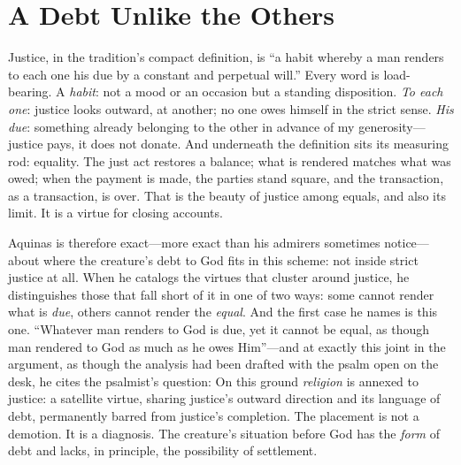 \section{A Debt Unlike the Others}

Justice, in the tradition's compact definition, is ``a habit whereby a man renders to each one his due by a constant and perpetual will.'' Every word is load-bearing. A \emph{habit}: not a mood or an occasion but a standing disposition. \emph{To each one}: justice looks outward, at another; no one owes himself in the strict sense. \emph{His due}: something already belonging to the other in advance of my generosity---justice pays, it does not donate. And underneath the definition sits its measuring rod: equality. The just act restores a balance; what is rendered matches what was owed; when the payment is made, the parties stand square, and the transaction, as a transaction, is over. That is the beauty of justice among equals, and also its limit. It is a virtue for closing accounts.

Aquinas is therefore exact---more exact than his admirers sometimes notice---about where the creature's debt to God fits in this scheme: not inside strict justice at all. When he catalogs the virtues that cluster around justice, he distinguishes those that fall short of it in one of two ways: some cannot render what is \emph{due}, others cannot render the \emph{equal}. And the first case he names is this one. ``Whatever man renders to God is due, yet it cannot be equal, as though man rendered to God as much as he owes Him''---and at exactly this joint in the argument, as though the analysis had been drafted with the psalm open on the desk, he cites the psalmist's question:  On this ground \emph{religion} is annexed to justice: a satellite virtue, sharing justice's outward direction and its language of debt, permanently barred from justice's completion. The placement is not a demotion. It is a diagnosis. The creature's situation before God has the \emph{form} of debt and lacks, in principle, the possibility of settlement.


